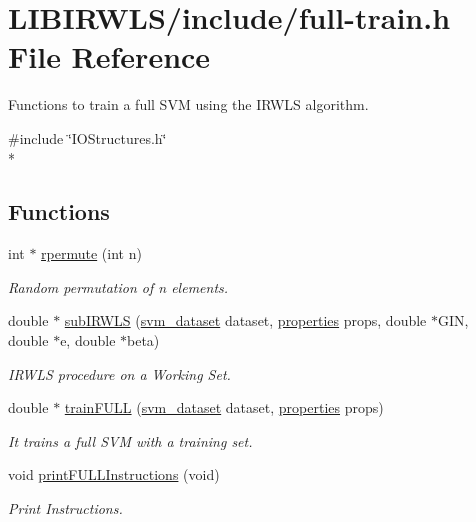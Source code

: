 \hypertarget{full-train_8h}{}\section{L\+I\+B\+I\+R\+W\+L\+S/include/full-\/train.h File Reference}
\label{full-train_8h}


Functions to train a full S\+VM using the I\+R\+W\+LS algorithm.  


{\ttfamily \#include \char`\"{}I\+O\+Structures.\+h\char`\"{}}\\*
\subsection*{Functions}
\begin{DoxyCompactItemize}
\item 
int $\ast$ \hyperlink{full-train_8h_a9e75aabe599f48c66cbda89320d68a71}{rpermute} (int n)
\begin{DoxyCompactList}\small\item\em Random permutation of n elements. \end{DoxyCompactList}\item 
double $\ast$ \hyperlink{full-train_8h_af736cb71af5e7e4cb062977793905f4d}{sub\+I\+R\+W\+LS} (\hyperlink{structsvm__dataset}{svm\+\_\+dataset} dataset, \hyperlink{structproperties}{properties} props, double $\ast$G\+IN, double $\ast$e, double $\ast$beta)
\begin{DoxyCompactList}\small\item\em I\+R\+W\+LS procedure on a Working Set. \end{DoxyCompactList}\item 
double $\ast$ \hyperlink{full-train_8h_ad719770a7de382211555ba831af2ea28}{train\+F\+U\+LL} (\hyperlink{structsvm__dataset}{svm\+\_\+dataset} dataset, \hyperlink{structproperties}{properties} props)
\begin{DoxyCompactList}\small\item\em It trains a full S\+VM with a training set. \end{DoxyCompactList}\item 
void \hyperlink{full-train_8h_ab5adf9258f0268e7daead3642e1d911a}{print\+F\+U\+L\+L\+Instructions} (void)
\begin{DoxyCompactList}\small\item\em Print Instructions. \end{DoxyCompactList}\item 

\end{DoxyCompactItemize}
